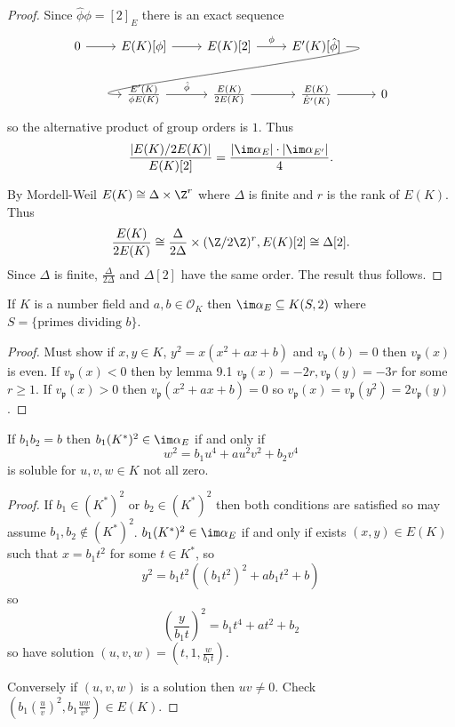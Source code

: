\documentclass[a4paper]{article}
\theoremstyle{definition}
\theoremstyle{theorem}
\renewcommand*{\O}{\mathcal{O}}
\begin{document}
\begin{proof}
  Since \(\hat \phi \phi = [2]_E\) there is an exact sequence
  \[
    \begin{tikzcd}
      0 \ar[r] & E(K)[\phi] \ar[r] & E(K)[2] \ar[r, "\phi"] & E'(K)[\hat \phi] \ar[dll, overlay, out=0, in=180] \\
      & \frac{E'(K)}{\phi E(K)} \ar[r, "\hat \phi"] & \frac{E(K)}{2E(K)} \ar[r] & \frac{E(K)}{\hat E'(K)} \ar[r] & 0
    \end{tikzcd}
  \]
  so the alternative product of group orders is \(1\). Thus
  \[
    \frac{|E(K)/2E(K)|}{E(K)[2]} = \frac{|\im \alpha_E| \cdot |\im \alpha_{E'}|}{4}.
  \]

  By Mordell-Weil \(E(K) \cong \Delta \times \Z^r\) where \(\Delta\) is finite and \(r\) is the rank of \(E(K)\). Thus
  \[
    \frac{E(K)}{2E(K)} \cong \frac{\Delta}{2\Delta} \times (\Z/2\Z)^r, E(K)[2] \cong \Delta[2].
  \]
  Since \(\Delta\) is finite, \(\frac{\Delta}{2\Delta}\) and \(\Delta[2]\) have the same order. The result thus follows.
\end{proof}

\begin{lemma}
  If \(K\) is a number field and \(a, b \in \O_K\) then \(\im \alpha_E \subseteq K(S, 2)\) where \(S = \{\text{primes dividing } b\}\).
\end{lemma}

\begin{proof}
  Must show if \(x, y \in K\), \(y^2 = x(x^2 + ax + b)\) and \(v_{\mathfrak p}(b) = 0\) then \(v_{\mathfrak p}(x)\) is even. If \(v_{\mathfrak p}(x) < 0\) then by lemma 9.1 \(v_{\mathfrak p}(x) = -2r, v_{\mathfrak p}(y) = -3r\) for some \(r \geq 1\). If \(v_{\mathfrak p}(x) > 0\) then \(v_{\mathfrak p}(x^2 + ax + b) = 0\) so \(v_{\mathfrak p}(x) = v_{\mathfrak p}(y^2) = 2 v_{\mathfrak p}(y)\).
\end{proof}

\begin{lemma}
  If \(b_1b_2 = b\) then \(b_1(K^*)^2 \in \im \alpha_E\) if and only if
  \[
    w^2 = b_1 u^4 + au^2v^2 + b_2v^4
  \]
  is soluble for \(u, v, w \in K\) not all zero.
\end{lemma}

\begin{proof}
  If \(b_1 \in (K^*)^2\) or \(b_2 \in (K^*)^2\) then both conditions are satisfied so may assume \(b_1, b_2 \notin (K^*)^2\). \(b_1(K^*)^2 \in \im \alpha_E\) if and only if exists \((x, y) \in E(K)\) such that \(x = b_1t^2\) for some \(t \in K^*\), so
  \[
    y^2 = b_1t^2 ((b_1t^2)^2 + ab_1t^2 + b)
  \]
  so
  \[
    (\frac{y}{b_1t})^2 = b_1t^4 + at^2 + b_2
  \]
  so have solution \((u, v, w) = (t, 1, \frac{w}{b_1t})\).

  Conversely if \((u, v, w)\) is a solution then \(uv \ne 0\). Check \((b_1 (\frac{u}{v})^2, b_1 \frac{uw}{v^3}) \in E(K)\).
\end{proof}
\end{document}
